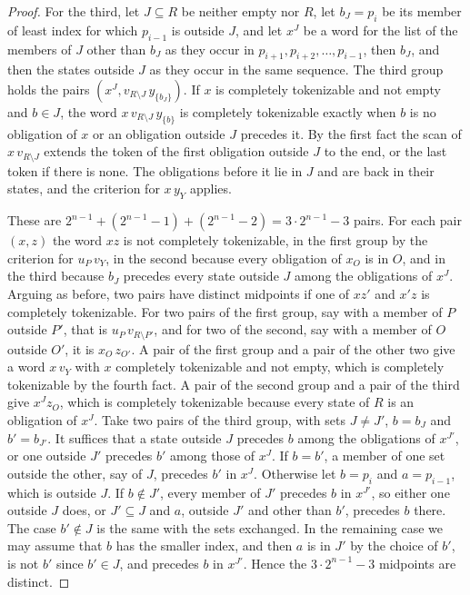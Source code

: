 \documentclass[11pt,a4paper]{article}
\theoremstyle{definition}
\theoremstyle{plain}
\begin{document}
\begin{proof}
For the third, let $J \subseteq R$ be neither empty nor $R$, let $b_J = p_i$ be its member of least index for which
$p_{i-1}$ is outside $J$, and let $x^J$ be a word for the list of the members of $J$ other than $b_J$ as they occur in
$p_{i+1}, p_{i+2}, \ldots, p_{i-1}$, then $b_J$, and then the states outside $J$ as they occur in the same sequence. The
third group holds the pairs $(x^J, v_{R \setminus J}\,y_{\{b_J\}})$. If $x$ is completely tokenizable and not empty and
$b \in J$, the word $x\,v_{R \setminus J}\,y_{\{b\}}$ is completely tokenizable exactly when $b$ is no obligation of $x$
or an obligation outside $J$ precedes it. By the first fact the scan of $x\,v_{R \setminus J}$ extends the token of the
first obligation outside $J$ to the end, or the last token if there is none. The obligations before it lie in $J$ and
are back in their states, and the criterion for $x\,y_Y$ applies.

These are $2^{n-1} + (2^{n-1} - 1) + (2^{n-1} - 2) = 3 \cdot 2^{n-1} - 3$ pairs. For each pair $(x, z)$ the word $xz$ is
not completely tokenizable, in the first group by the criterion for $u_P\,v_Y$, in the second because every obligation
of $x_O$ is in $O$, and in the third because $b_J$ precedes every state outside $J$ among the obligations of $x^J$.
Arguing as before, two pairs have distinct midpoints if one of $xz'$ and $x'z$ is completely tokenizable. For two pairs
of the first group, say with a member of $P$ outside $P'$, that is $u_P\,v_{R \setminus P'}$, and for two of the second,
say with a member of $O$ outside $O'$, it is $x_O\,z_{O'}$. A pair of the first group and a pair of the other two give a
word $x\,v_Y$ with $x$ completely tokenizable and not empty, which is completely tokenizable by the fourth fact. A pair
of the second group and a pair of the third give $x^J z_O$, which is completely tokenizable because every state of $R$
is an obligation of $x^J$. Take two pairs of the third group, with sets $J \neq J'$, $b = b_J$ and $b' = b_{J'}$. It
suffices that a state outside $J$ precedes $b$ among the obligations of $x^{J'}$, or one outside $J'$ precedes $b'$
among those of $x^J$. If $b = b'$, a member of one set outside the other, say of $J$, precedes $b'$ in $x^J$. Otherwise
let $b = p_i$ and $a = p_{i-1}$, which is outside $J$. If $b \notin J'$, every member of $J'$ precedes $b$ in $x^{J'}$,
so either one outside $J$ does, or $J' \subseteq J$ and $a$, outside $J'$ and other than $b'$, precedes $b$ there. The
case $b' \notin J$ is the same with the sets exchanged. In the remaining case we may assume that $b$ has the smaller
index, and then $a$ is in $J'$ by the choice of $b'$, is not $b'$ since $b' \in J$, and precedes $b$ in $x^{J'}$. Hence
the $3 \cdot 2^{n-1} - 3$ midpoints are distinct.
\end{proof}
\end{document}
